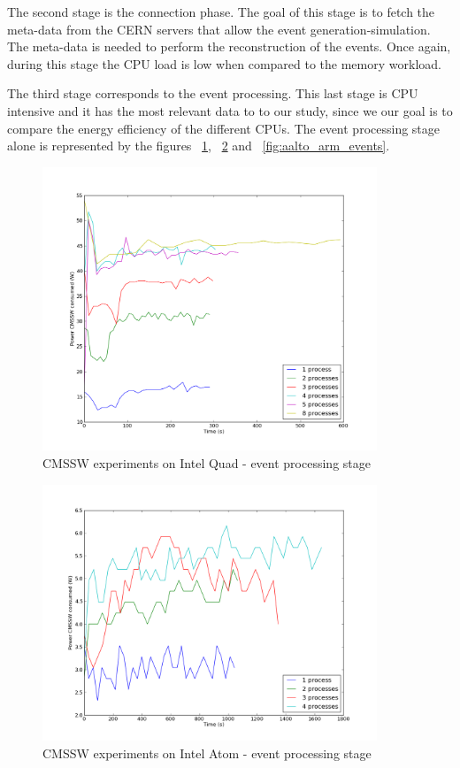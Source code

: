 The second stage is the connection phase. The goal of this stage is to fetch the meta-data from
the CERN servers that allow the event generation-simulation. The meta-data is needed to perform the reconstruction of the events. Once again, 
during this stage the CPU load is low when compared to the memory workload. 

The third stage corresponds to the event processing. This last stage is CPU intensive and it has the most relevant data to to our study, since we our goal is to compare the energy efficiency of the different CPUs. The event processing stage alone is represented by 
the figures ~\ref{fig:aalto_quad_events}, ~\ref{fig:aalto_atom_events} and ~\ref{fig:aalto_arm_events}.


\begin{figure}[h]
  \centering
    \includegraphics[width=100mm]{"img/aalto/aalto_quadEvents"}
    \caption{CMSSW experiments on Intel Quad - event processing stage}
    \label{fig:aalto_quad_events}
\end{figure}

\begin{figure}[h]
  \centering
    \includegraphics[width=100mm]{"img/aalto/aalto_atomEvents"}
    \caption{CMSSW experiments on Intel Atom - event processing stage}
    \label{fig:aalto_atom_events}
\end{figure}

